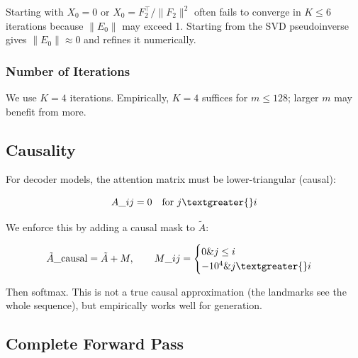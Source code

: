 Starting with $X_0 = 0$ or $X_0 = F_2^\top / \|F_2\|^2$ often fails to 
converge in $K \le 6$ iterations because $\|E_0\|$ may exceed 1. Starting 
from the SVD pseudoinverse gives $\|E_0\| \approx 0$ and refines it 
numerically.

\subsubsection{Number of Iterations}

We use $K = 4$ iterations. Empirically, $K = 4$ suffices for 
$m \le 128$; larger $m$ may benefit from more.

\subsection{Causality}

For decoder models, the attention matrix must be lower-triangular (causal):

\[
A\_{ij} = 0 \quad \text{for } j \textgreater{} i
\]

We enforce this by adding a causal mask to $\tilde{A}$:

\[
\tilde{A}\_\text{causal} = \tilde{A} + M, \qquad
M\_{ij} = \begin{cases} 0 \& j \le i \\ -10^4 \& j \textgreater{} i \end{cases}
\]

Then softmax. This is not a true causal approximation (the landmarks see 
the whole sequence), but empirically works well for generation.

\subsection{Complete Forward Pass}

